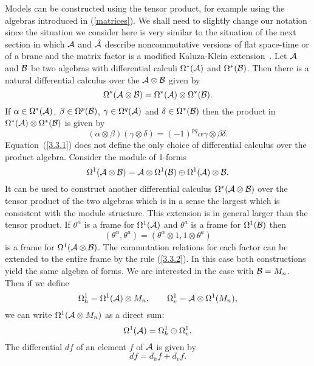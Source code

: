 \documentclass[a4paper,12pt]{article}
\def\h#1{\hat #1}
\def\c#1{{\cal #1}}
\begin{document}
Models can be constructed using the tensor product, for example using
the algebras introduced in (\ref{matrices}). We shall need to slightly
change our notation since the situation we consider here is very
similar to the situation of the next section in which $\c{A}$ and
$\h{\c}{A}$ describe noncommutative versions of flat space-time or of
a brane and the matrix factor is a modified Kaluza-Klein
extension~\cite{Mad89c}.  Let $\c{A}$ and $\c{B}$ be two algebras with
differential calculi $\Omega^*(\c{A})$ and $\Omega^*(\c{B})$. Then
there is a natural differential calculus over the $\c{A} \otimes
\c{B}$ given by
\begin{equation}
\Omega^*(\c{A} \otimes \c{B}) = 
\Omega^*(\c{A}) \otimes \Omega^*(\c{B}).                   \label{3.3.1}
\end{equation}
If $\alpha \in \Omega^* (\c{A})$, $\beta \in \Omega^p (\c{B})$,
$\gamma \in \Omega^q (\c{A})$ and $\delta \in \Omega^* (\c{B})$ then
the product in $\Omega^*(\c{A}) \otimes \Omega^*(\c{B})$ is given by
\begin{equation}
(\alpha \otimes \beta)(\gamma \otimes \delta) 
= (-1)^{pq} \alpha\gamma \otimes \beta\delta.             \label{3.3.2}
\end{equation}
Equation~(\ref{3.3.1}) does not define the only choice of differential
calculus over the product algebra. Consider the module of 1-forms
$$
\Omega^1(\c{A} \otimes \c{B}) = \c{A} \otimes \Omega^1(\c{B})
\oplus \Omega^1(\c{A}) \otimes \c{B}.
$$
It can be used to construct another differential calculus
$\Omega^*(\c{A} \otimes \c{B})$ over the tensor product of the two
algebras which is in a sense the largest which is consistent with the
module structure. This extension is in general larger than the tensor
product. If $\theta^\alpha$ is a frame for $\Omega^1(\c{A})$ and
$\theta^a$ is a frame for $\Omega^1(\c{B})$ then
$$
(\theta^\alpha, \theta^a) = (\theta^\alpha \otimes 1, 1 \otimes
\theta^a)
$$
is a frame for $\Omega^1(\c{A} \otimes \c{B})$. The commutation
relations for each factor can be extended to the entire frame by the
rule (\ref{3.3.2}). In this case both constructions yield the same
algebra of forms. We are interested in the case with $\c{B} =
M_n$. Then if we define
$$
\Omega^1_h = \Omega^1(\c{A}) \otimes M_n, \qquad \Omega^1_v = \c{A}
\otimes \Omega^1(M_n),
$$
we can write $\Omega^1(\c{A}\otimes M_n)$ as a direct sum:
$$
\Omega^1(\c{A}) =  \Omega^1_h \oplus \Omega^1_v.             %
$$
The differential $df$ of an element $f$ of $\c{A}$ is given by
$$
df = d_hf + d_vf.                                            %
$$
\end{document}
